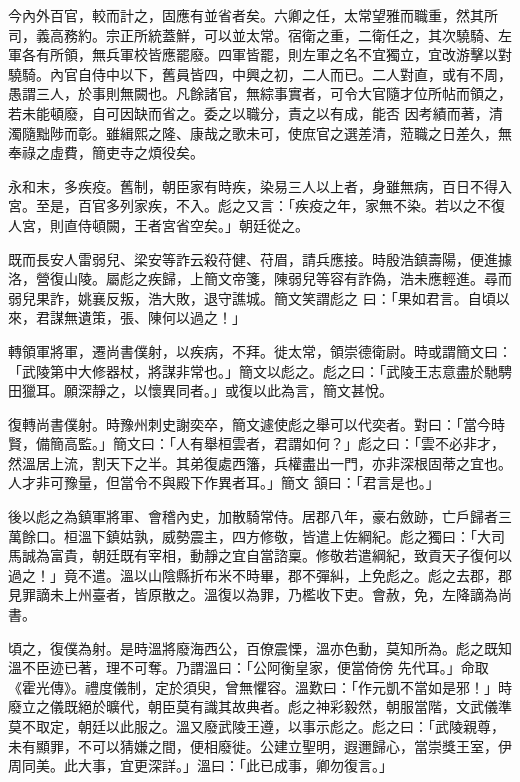 \begin{pinyinscope}
 今內外百官，較而計之，固應有並省者矣。六卿之任，太常望雅而職重，然其所司，義高務約。宗正所統蓋鮮，可以並太常。宿衛之重，二衛任之，其次驍騎、左軍各有所領，無兵軍校皆應罷廢。四軍皆罷，則左軍之名不宜獨立，宜改游擊以對驍騎。內官自侍中以下，舊員皆四，中興之初，二人而已。二人對直，或有不周，愚謂三人，於事則無闕也。凡餘諸官，無綜事實者，可令大官隨才位所帖而領之，若未能頓廢，自可因缺而省之。委之以職分，責之以有成，能否
 因考績而著，清濁隨黜陟而彰。雖緝熙之隆、康哉之歌未可，使庶官之選差清，蒞職之日差久，無奉祿之虛費，簡吏寺之煩役矣。



 永和末，多疾疫。舊制，朝臣家有時疾，染易三人以上者，身雖無病，百日不得入宮。至是，百官多列家疾，不入。彪之又言：「疾疫之年，家無不染。若以之不復人宮，則直侍頓闕，王者宮省空矣。」朝廷從之。



 既而長安人雷弱兒、梁安等詐云殺苻健、苻眉，請兵應接。時殷浩鎮壽陽，便進據洛，營復山陵。屬彪之疾歸，上簡文帝箋，陳弱兒等容有詐偽，浩未應輕進。尋而弱兒果詐，姚襄反叛，浩大敗，退守譙城。簡文笑謂彪之
 曰：「果如君言。自頃以來，君謀無遺策，張、陳何以過之！」



 轉領軍將軍，遷尚書僕射，以疾病，不拜。徙太常，領崇德衛尉。時或謂簡文曰：「武陵第中大修器杖，將謀非常也。」簡文以彪之。彪之曰：「武陵王志意盡於馳騁田獵耳。願深靜之，以懷異同者。」或復以此為言，簡文甚悅。



 復轉尚書僕射。時豫州刺史謝奕卒，簡文遽使彪之舉可以代奕者。對曰：「當今時賢，備簡高監。」簡文曰：「人有舉桓雲者，君謂如何？」彪之曰：「雲不必非才，然溫居上流，割天下之半。其弟復處西籓，兵權盡出一門，亦非深根固蒂之宜也。人才非可豫量，但當令不與殿下作異者耳。」簡文
 頷曰：「君言是也。」



 後以彪之為鎮軍將軍、會稽內史，加散騎常侍。居郡八年，豪右斂跡，亡戶歸者三萬餘口。桓溫下鎮姑孰，威勢震主，四方修敬，皆遣上佐綱紀。彪之獨曰：「大司馬誠為富貴，朝廷既有宰相，動靜之宜自當諮稟。修敬若遣綱紀，致貢天子復何以過之！」竟不遣。溫以山陰縣折布米不時畢，郡不彈糾，上免彪之。彪之去郡，郡見罪謫未上州臺者，皆原散之。溫復以為罪，乃檻收下吏。會赦，免，左降謫為尚書。



 頃之，復僕為射。是時溫將廢海西公，百僚震慄，溫亦色動，莫知所為。彪之既知溫不臣迹已著，理不可奪。乃謂溫曰：「公阿衡皇家，便當倚傍
 先代耳。」命取《霍光傳》。禮度儀制，定於須臾，曾無懼容。溫歎曰：「作元凱不當如是邪！」時廢立之儀既絕於曠代，朝臣莫有識其故典者。彪之神彩毅然，朝服當階，文武儀準莫不取定，朝廷以此服之。溫又廢武陵王遵，以事示彪之。彪之曰：「武陵親尊，未有顯罪，不可以猜嫌之間，便相廢徙。公建立聖明，遐邇歸心，當崇獎王室，伊周同美。此大事，宜更深詳。」溫曰：「此已成事，卿勿復言。」




\end{pinyinscope}
